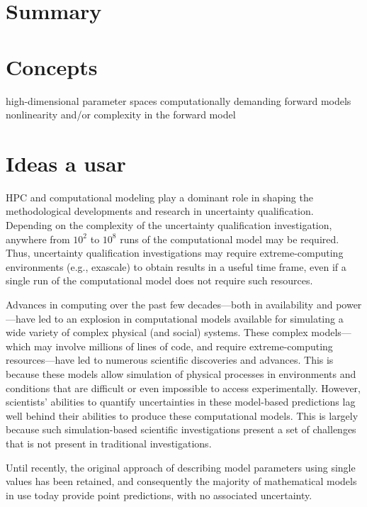 \section{Summary}

\section{Concepts}
high-dimensional parameter spaces \cite{DEnergy2009}
computationally demanding forward models 
nonlinearity and/or complexity in the forward model

\section{Ideas a usar}
HPC and computational modeling play a dominant role in shaping the methodological developments and research in uncertainty qualification. Depending on the complexity of the uncertainty qualification investigation, anywhere from $10^{2}$ to $10^{8}$ runs of the computational model may be required. Thus, uncertainty qualification investigations may require extreme-computing environments (e.g., exascale) to obtain results in a useful time frame, even if a single run of the computational model does not require such resources. \cite{DEnergy2009}

Advances in computing over the past few decades—both in availability and power—have led to an explosion in computational models available for simulating a wide variety of complex physical (and social) systems. These complex models—which may involve millions of lines of code, and require extreme-computing resources—have led to numerous scientific discoveries and advances. This is because these models allow simulation of physical processes in environments and conditions that are difficult or even impossible to access experimentally. However, scientists’ abilities to quantify uncertainties in these model-based predictions lag well behind their abilities to produce these computational models. This is largely because such simulation-based scientific investigations present a set of challenges that is not present in traditional investigations.

\cite{DEnergy2009}

Until recently, the original approach of describing model parameters using single values has been retained, and consequently the majority of mathematical models in use today provide point predictions, with no associated uncertainty. \cite{Johnstone2015}

